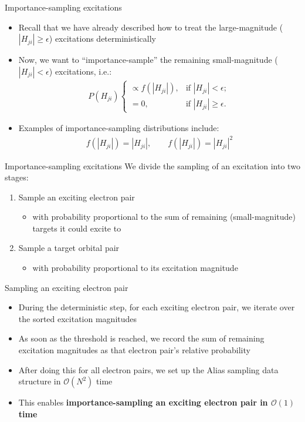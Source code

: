 \documentclass[amsmath]{beamer}
\begin{document}
\begin{frame}{Importance-sampling excitations}
	\begin{itemize}
	\item Recall that we have already described how to treat the large-magnitude ($|H_{ji}|\ge \epsilon$) excitations deterministically
	\item Now, we want to ``importance-sample'' the remaining small-magnitude ($|H_{ji}|<\epsilon$) excitations, i.e.:
	\begin{eqnarray}
		P(H_{ji}) \begin{cases}
			\propto  f(|H_{ji}|),&\textrm{if $|H_{ji}| < \epsilon$};\\
			=  0, &\textrm{if $|H_{ji}|\ge\epsilon$}. %
		\end{cases}
	\end{eqnarray}
	\item Examples of importance-sampling distributions include: \begin{eqnarray}f(|H_{ji}|) = |H_{ji}|,\quad \quad f(|H_{ji}|) = |H_{ji}|^2\end{eqnarray}
	\end{itemize}
\end{frame}

\begin{frame}{Importance-sampling excitations}
	We divide the sampling of an excitation into two stages:
	\begin{enumerate}
		\item Sample an exciting electron pair
			\begin{itemize}
				\item with probability proportional to the sum of remaining (small-magnitude) targets it could excite to
			\end{itemize}
		\item Sample a target orbital pair
		\begin{itemize}
			\item with probability proportional to its excitation magnitude
		\end{itemize}
	\end{enumerate}
\end{frame}

\begin{frame}{Sampling an exciting electron pair}
	\begin{itemize}
		\item During the deterministic step, for each exciting electron pair, we iterate over the sorted excitation magnitudes
		\item As soon as the threshold is reached, we record the sum of remaining excitation magnitudes as that electron pair's relative probability
		\item After doing this for all electron pairs, we set up the Alias sampling data structure in $\mathcal{O}(N^2)$ time
		\item This enables \textbf{importance-sampling an exciting electron pair in $\mathcal{O}(1)$ time}
	\end{itemize}
\end{frame}
\end{document}
